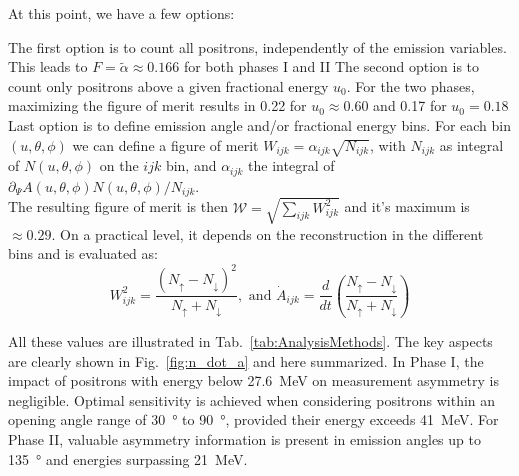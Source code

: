 \begin{refsection}
    At this point, we have a few options:
    \begin{outline}
        \1[A] The first option is to count all positrons, independently of the emission variables. This leads to $F=\tilde\alpha \approx 0.166$ for both phases I and II
        \1[T] The second option is to count only positrons above a given fractional energy $u_0$. For the two phases, maximizing the figure of merit results in 0.22 for $u_0\approx0.60$ and 0.17 for $u_0=0.18$
        \1[W] Last option is to define emission angle and/or fractional energy bins. 
        For each bin $(u, \theta, \phi)$ we can define a figure of merit $W_{ijk} = \alpha_{ijk} \sqrt{N_{ijk}}$, with $N_{ijk}$ as integral of $ N(u, \theta, \phi)$ on the $ijk$ bin, and $\alpha_{ijk}$ the integral of $ \partial_\Psi A(u,
	\theta, \phi) N(u, \theta, \phi) / N_{ijk}$.\\
        The resulting figure of merit is then $\mathcal{W} =  \sqrt{\sum_{ijk} W_{ijk}^2}$ and it's maximum is $\approx0.29$.
        On a practical level, it depends on the reconstruction in the different bins and is evaluated as:
        $$W^2_{ijk} = \frac{(N_\uparrow - N_\downarrow)^2}{N_\uparrow + N_\downarrow},\text{ and }  \dot A_{ijk} = \frac{d}{dt} \left( \frac{N_\uparrow - N_\downarrow}{N_\uparrow + N_\downarrow} \right)$$
    \end{outline}
    All these values are illustrated in Tab.~\ref{tab:AnalysisMethods}. 
    The key aspects are clearly shown in Fig.~\ref{fig:n_dot_a} and here summarized.
    In Phase I, the impact of positrons with energy below \SI{27.6}{MeV} on measurement asymmetry is negligible. 
    Optimal sensitivity is achieved when considering positrons within an opening angle range of \SI{30}{\degree} to \SI{90}{\degree}, provided their energy exceeds \SI{41}{MeV}. 
    For Phase II, valuable asymmetry information is present in emission angles up to \SI{135}{\degree} and energies surpassing \SI{21}{MeV}.
    

\end{refsection}
